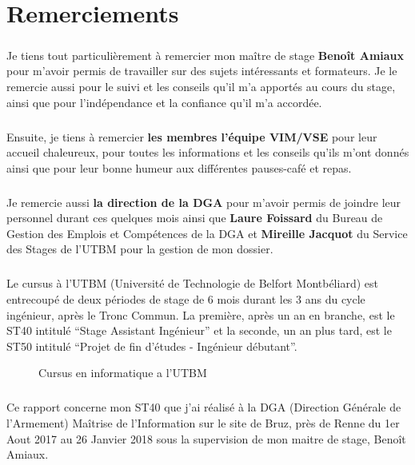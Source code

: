 \documentclass[11pt, book, english, french]{upmethodology-document}
\begin{document}
	\chapter*{Remerciements}
		\paragraph*{}
			Je tiens tout particulièrement à remercier mon maître de stage \textbf{Benoît Amiaux} pour m'avoir permis de travailler sur des sujets intéressants et formateurs. Je le remercie aussi pour le suivi et les conseils qu'il m'a apportés au cours du stage, ainsi que pour l'indépendance et la confiance qu'il m'a accordée.
		\paragraph*{}
			Ensuite, je tiens à remercier \textbf{les membres l'équipe VIM/VSE} pour leur accueil chaleureux, pour toutes les informations et les conseils qu’ils m’ont donnés ainsi que pour leur bonne humeur aux différentes pauses-café et repas.
		\paragraph*{}
			Je remercie aussi \textbf{la direction de la DGA} pour m’avoir permis de  joindre leur personnel durant ces quelques mois ainsi que \textbf{Laure Foissard} du Bureau de Gestion des Emplois et Compétences de la DGA et \textbf{Mireille Jacquot} du Service des Stages de l'UTBM pour la gestion de mon dossier.
	\tableofcontents{}
	\listoffigures{}
		\paragraph*{}
			Le cursus à l'UTBM (Université de Technologie de Belfort Montbéliard) est entrecoupé de deux périodes de stage de 6 mois durant les 3 ans du cycle ingénieur, après le Tronc Commun. La première, après un an en branche, est le ST40 intitulé ``Stage Assistant Ingénieur'' et la seconde, un an plus tard, est le ST50 intitulé ``Projet de fin d’études - Ingénieur débutant''.
		\begin{figure}[H]
			\centering%
			\caption{Cursus en informatique a l'UTBM}%
			\label{fig:Cursus_INFO_UTBM}%
		\end{figure}
		\paragraph*{}
			Ce rapport concerne mon ST40 que j'ai réalisé à la DGA (Direction Générale de l'Armement) Maîtrise de l'Information sur le site de Bruz, près de Renne du 1er Aout 2017 au 26 Janvier 2018 sous la supervision de mon maitre de stage, Benoît Amiaux.
\end{document}
